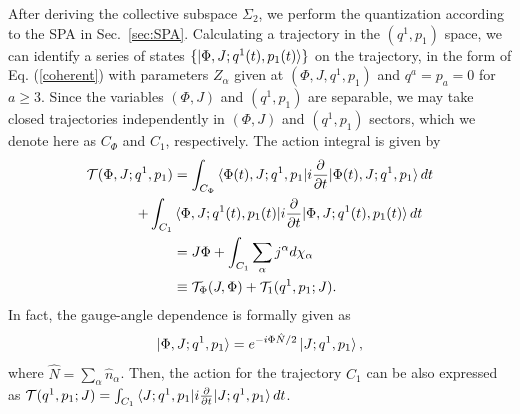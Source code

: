 \documentclass[11pt]{book} %
\begin{document}
After deriving the collective subspace $\Sigma_2$, 
we perform the quantization according to the SPA in Sec.~\ref{sec:SPA}.
Calculating a trajectory in the $(q^1,p_1)$ space,
we can identify a series of states $\{\ket{\Phi,J;q^1(t),p_1(t)}\}$
on the trajectory,
in the form of Eq. (\ref{coherent})
with parameters $Z_\alpha$ given at $(\Phi,J,q^1,p_1)$ and $q^a=p_a=0$ for
$a\geq 3$.
Since the variables $(\Phi,J)$ and $(q^1,p_1)$ are separable,
we may take closed trajectories independently in $(\Phi,J)$ and $(q^1,p_1)$
sectors, which we denote here as $C_\Phi$ and $C_1$, respectively.
The action integral is given by
\begin{align}
\mathcal{T}(\Phi,J;q^1,p_1)
&= \int_{C_\Phi} \braket{\Phi(t),J;q^1,p_1|i\frac{\partial}{\partial t}|\Phi(t),J;q^1,p_1} dt \nonumber \\
+ \int_{C_1} &\braket{\Phi,J;q^1(t),p_1(t)|i\frac{\partial}{\partial t}|\Phi,J;q^1(t),p_1(t)} dt
 \nonumber \\
	&=J\Phi + \int_{C_1} \sum_\alpha j^\alpha d\chi_\alpha
	\nonumber \\
	&\equiv \mathcal{T}_\Phi(J,\Phi) +\mathcal{T}_1(q^1,p_1;J) .
\end{align}
In fact, the gauge-angle dependence is formally given as
\begin{equation}
  \ket{\Phi,J;q^1,p_1} = e^{-i\Phi \hat{N}/2} \ket{J;q^1,p_1},
\end{equation}
where $\hat{N}=\sum_\alpha \hat{n}_\alpha$.
Then, the action for the trajectory $C_1$ can be also expressed as
$\mathcal{T}(q^1,p_1;J)=
 \int_{C_1} \braket{J;q^1,p_1|i\frac{\partial}{\partial t}|J;q^1,p_1} dt$.
\end{document}
